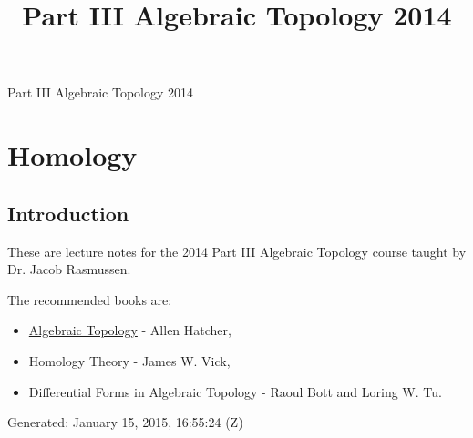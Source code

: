 \documentclass[10pt,]{book}
\title{Part III Algebraic Topology 2014}
\author{}
\date{}
\theoremstyle{plain}
\theoremstyle{definition}
\numberwithin{equation}{section}
\begin{document}
\frontmatter
\thispagestyle{empty}
\begin{center}
{\Huge Part III Algebraic Topology 2014}
\end{center}\par
{}
\clearpage
\thispagestyle{empty}
\clearpage
\maketitle
\clearpage
\thispagestyle{empty}
\clearpage
\setcounter{tocdepth}{1}
\renewcommand*\contentsname{Contents}
\tableofcontents
\mainmatter
\typeout{************************************************}
\typeout{************************************************}
\chapter[Homology]{Homology}\label{chap-homology}
\typeout{************************************************}
\typeout{************************************************}
\section[Introduction]{Introduction}\label{sec-introduction}

          These are lecture notes for the 2014 Part III Algebraic Topology course taught by Dr. Jacob Rasmussen.
\par

          The recommended books are:
          \begin{itemize}
\item{}\href{http://www.math.cornell.edu/~hatcher/AT/ATpage.html}{Algebraic Topology} - Allen Hatcher,\item{}Homology Theory - James W. Vick,\item{}Differential Forms in Algebraic Topology - Raoul Bott and Loring W. Tu.\end{itemize}

\par

          Generated: January 15, 2015, 16:55:24 (Z)
\typeout{************************************************}
\typeout{************************************************}
\end{document}
